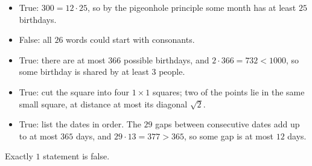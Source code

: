 \begin{itemize}
\item True: $300=12\cdot25$, so by the pigeonhole principle some month has at least $25$ birthdays.
\item False: all $26$ words could start with consonants.
\item True: there are at most $366$ possible birthdays, and $2\cdot366=732<1000$, so some birthday is shared by at least $3$ people.
\item True: cut the square into four $1\times1$ squares; two of the points lie in the same small square, at distance at most its diagonal $\sqrt2$.
\item True: list the dates in order. The $29$ gaps between consecutive dates add up to at most $365$ days, and $29\cdot13=377>365$, so some gap is at most $12$ days.
\end{itemize}
Exactly $\boxed{1}$ statement is false.
